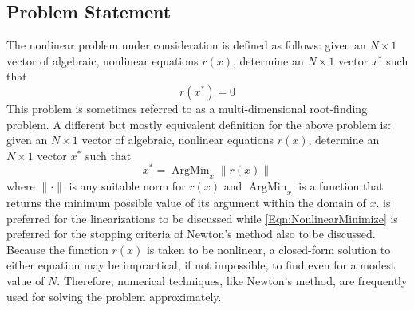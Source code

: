 \documentclass[Prelim,12pt]{WisconsinThesis}
\newcommand{\by}    {\!\times\!}
\DeclareMathOperator*{\ArgMin}{ArgMin}
\begin{document}
\subsection{Problem Statement}
The nonlinear problem under consideration is defined as follows: given an $N \by 1$ vector of algebraic, nonlinear equations $r(x)$, determine an $N \by 1$ vector $x^*$ such that
\begin{equation}
    r(x^*) = 0
    \label{Eqn:NonlinearRootFind}
\end{equation}
This problem is sometimes referred to as a multi-dimensional root-finding problem.
A different but mostly equivalent definition for the above problem is: given an $N \by 1$ vector of algebraic, nonlinear equations $r(x)$, determine an $N \by 1$ vector $x^*$ such that
\begin{equation}
    x^* = \ArgMin_{x} \|r(x)\|
    \label{Eqn:NonlinearMinimize}
\end{equation}
where $\|\cdot\|$ is any suitable norm for $r(x)$ and $\ArgMin_x$ is a function that returns the minimum possible value of its argument within the domain of $x$.
 is preferred for the linearizations to be discussed while \cref{Eqn:NonlinearMinimize} is preferred for the stopping criteria of Newton's method also to be discussed.
Because the function $r(x)$ is taken to be nonlinear, a closed-form solution to either equation may be impractical, if not impossible, to find even for a modest value of $N$.
Therefore, numerical techniques, like Newton's method, are frequently used for solving the problem approximately.
\end{document}
